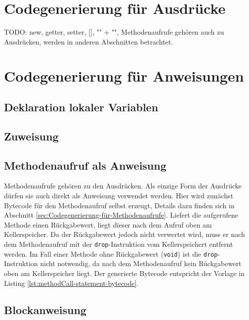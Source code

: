 \section{Codegenerierung für Ausdrücke}
\label{sec:Codegenerierung-für-Ausdrücke}

TODO: new, getter, setter, [], "" + "", Methodenaufrufe gehören auch zu Ausdrücken, werden in anderen Abschnitten betrachtet.

\section{Codegenerierung für Anweisungen}

\subsection{Deklaration lokaler Variablen}

\subsection{Zuweisung}

\subsection{Methodenaufruf als Anweisung}
Methodenaufrufe gehören zu den Ausdrücken. Als einzige Form der Ausdrücke dürfen sie auch direkt als Anweisung verwendet werden. Hier wird zunächst Bytecode für den Methodenaufruf selbst erzeugt, Details dazu finden sich in Abschnitt \ref{sec:Codegenerierung-für-Methodenaufrufe}. Liefert die aufgerufene Methode einen Rückgabewert, liegt dieser nach dem Aufruf oben am Kellerspeicher. Da der Rückgabewert jedoch nicht verwertet wird, muss er nach dem Methodenaufruf mit der \lstinline{drop}-Instruktion vom Kellerspeichert entfernt werden. Im Fall einer Methode ohne Rückgabewert (\lstinline{void}) ist die \lstinline{drop}-Instruktion nicht notwendig, da nach dem Methodenaufruf kein Rückgabewert oben am Kellerspeicher liegt. Der generierte Bytecode entspricht der Vorlage in Listing \ref{lst:methodCall-statement-bytecode}.



\subsection{Blockanweisung}


